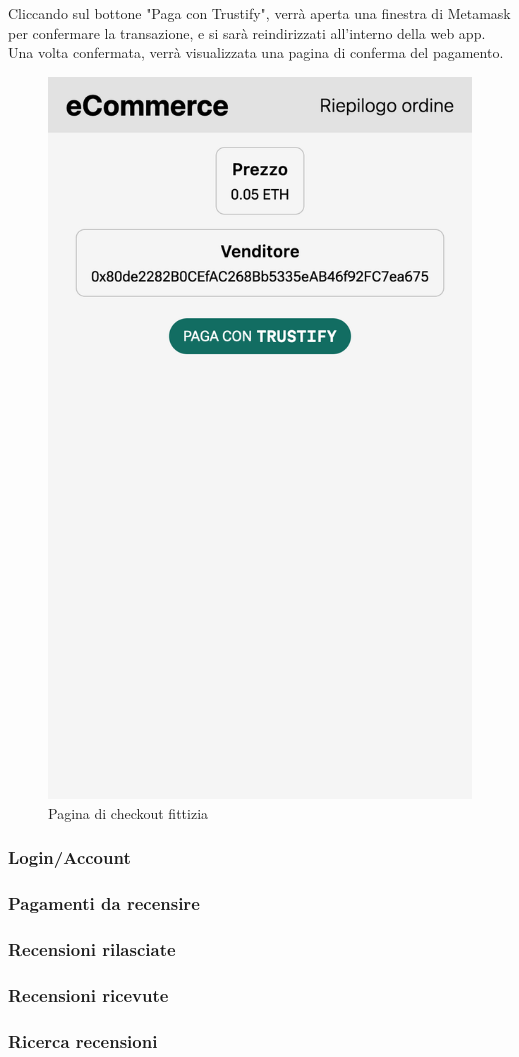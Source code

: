 Cliccando sul bottone "Paga con Trustify", verrà aperta una finestra di Metamask per confermare la transazione, e si sarà reindirizzati all'interno della web app. Una volta confermata, verrà visualizzata una pagina di conferma del pagamento.

\begin{figure}[H]
    \centering
    \includegraphics[scale=0.25]{src/img/checkout.png}
    \caption{Pagina di checkout fittizia}
\end{figure}

\subsubsection{Login/Account}

\subsubsection{Pagamenti da recensire}

\subsubsection{Recensioni rilasciate}

\subsubsection{Recensioni ricevute}

\subsubsection{Ricerca recensioni}